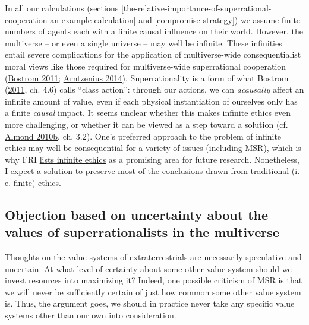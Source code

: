 In all our calculations (sections
\ref{the-relative-importance-of-superrational-cooperation-an-example-calculation}
and \ref{compromise-strategy}) 
we assume finite
numbers of agents each with a finite causal influence on their world. However, the multiverse -- or
even a single universe -- may well be infinite. These infinities entail severe complications for the
application of multiverse-wide consequentialist moral views like those required for
multiverse-wide superrational cooperation
(\href{http://www.nickbostrom.com/ethics/infinite.pdf}{Bostrom
2011;}
\href{http://lukemuehlhauser.com/wp-content/uploads/Arntzenius-Utilitarianism-decision-theory-and-eternity.pdf}{Arntzenius
2014)}. Superrationality is a form of what Bostrom
(\href{http://www.nickbostrom.com/ethics/infinite.pdf}{2011}, ch.
4.6) calls ``class action'': through our actions, we can
\emph{acausally} affect an infinite amount of value, even if each
physical instantiation of ourselves only has a finite \emph{causal}
impact. It seems unclear whether this makes infinite ethics even more
challenging, or whether it can be viewed as a step toward a solution
(cf.
\href{https://web.archive.org/web/20120310010225/http://www.paul-almond.com/Correlation2.pdf}{Almond
2010b}, ch. 3.2). One's preferred approach to the problem of infinite
ethics may well be consequential for a variety of issues (including
MSR), which is why FRI
\href{https://foundational-research.org/infinity-in-ethics/}{lists
infinite ethics} as a promising area for future research. Nonetheless,
I expect a solution to preserve most of the conclusions drawn from
traditional (i.\,e. finite) ethics.

\hypertarget{objection-based-on-uncertainty-about-the-values-of-superrationalists-in-the-multiverse}{\subsection{Objection
based on uncertainty about the values of superrationalists in the
multiverse}\label{objection-based-on-uncertainty-about-the-values-of-superrationalists-in-the-multiverse}}

Thoughts on the value systems of extraterrestrials are necessarily
speculative and uncertain. At what level of certainty about some other
value system should we invest resources into maximizing it? Indeed, one
possible criticism of MSR is that we will never be sufficiently certain
of just how common some other value system is. Thus, the argument goes,
we should in practice never take any specific value systems other than our own
into consideration.

